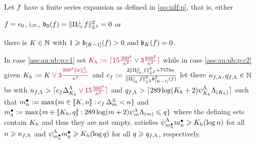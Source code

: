 \begin{as}\label{ass:au:ub:p}
Let $\xdf$ have a finite series expansion as defined in \ref{oo:xdf:p}, that is, either
\begin{inparaenum}[i]
\renewcommand{\theenumi}{\dgrau\rm(\alph{enumi})}
\item\label{ass:au:ub:p:c1} $\xdf=\bas_0$, i.e., $\bias[0](\xdf)=\VnormLp{\Proj[{\mHiH[0]}]^\perp\xdf}^2=0$ or
\item\label{ass:au:ub:p:c2} there is $K\in\Nz$ with $1\geq \bias[{[K-1] }](\xdf)>0$ and $\bias[K](\xdf)=0$.
\end{inparaenum}
In case \ref{ass:au:ub:p:c1} set $\dr K_{\ydf}:=\ceil{15\tfrac{300^4}{\cpen^2}\vee3\tfrac{800^2}{\cpen^2}}$ while in case \ref{ass:au:ub:p:c2} given $K_{\ydf}:=K\dr\vee
3\tfrac{800^2\Vnormlp[1]{\fydf}^2}{\cpen^2}$ and $c_{\xdf}:=\tfrac{2\VnormLp{\Proj[{\mHiH[0]}]^\perp\xdf}^2+7576\cpen}{\VnormLp{\Proj[{\mHiH[0]}]^\perp\xdf}^2\bias[{[K-1]}]^2(\xdf)}$ let there $\ssY_{\xdf,\iSv},\ssE_{\xdf,\iSv}\in\Nz$ be with $\ssY_{\xdf,\iSv}>\ceil{c_{\xdf}\DipenSv[K_{\ydf}]\dr\vee15\tfrac{300^4}{\cpen^2}}$ and $\ssE_{\xdf,\iSv}>\ceil{289\log(K_{\ydf}+2)\cmiSv[K_{\ydf}]\miSv[K_{\ydf}]}$ such that $\sDi{\ssY}:=\max\{\Di\in\nset{K,\ssY}:c_{\xdf}\,\DipenSv<\ssY\}$ and $\sDi{\ssE}:=\max\{\Di\in\nset{K_{\ydf},\ssE}:289\log(\Di+2)\cmiSv\miSv\leq\ssE\}$ where the defining sets contain $K_{\ydf}$ and thus they are not empty, satisfies $\cmiSv[\sDi{\ssY}]\sDi{\ssY}\geq K_{\ydf}(\log\ssY)$ for all $\ssY\geq \ssY_{\xdf,\iSv}$ and $\cmiSv[\sDi{\ssE}]\sDi{\ssE}\geq K_{\ydf}(\log\ssE)$ for all $\ssE\geq \ssE_{\xdf,\iSv}$, respectively.
\end{as}

